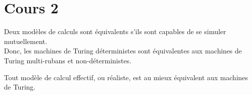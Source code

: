 \section{Cours 2}
Deux modèles de calculs sont équivalents s'ils sont capables de se simuler mutuellement.\\
Donc, les machines de Turing déterministes sont équivalentes aux machines de Turing multi-rubans et non-déterministes.

Tout modèle de calcul effectif, ou réaliste, est au mieux équivalent aux machines de Turing.
